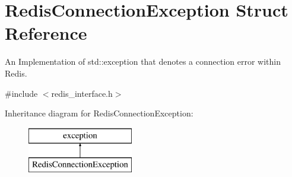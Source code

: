 \hypertarget{structRedisConnectionException}{\section{Redis\-Connection\-Exception Struct Reference}
\label{structRedisConnectionException}
}


An Implementation of std\-::exception that denotes a connection error within Redis.  




{\ttfamily \#include $<$redis\-\_\-interface.\-h$>$}

Inheritance diagram for Redis\-Connection\-Exception\-:\begin{figure}[H]
\begin{center}
\leavevmode
\includegraphics[height=2.000000cm]{structRedisConnectionException}
\end{center}
\end{figure}
